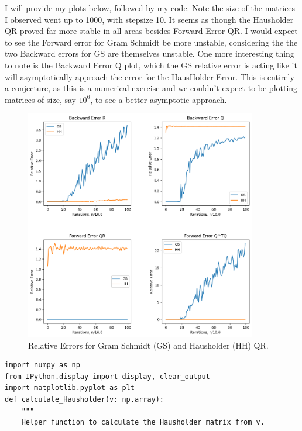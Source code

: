 \partbreak
\begin{solution}

    I will provide my plots below, followed by my code. Note the size of the matrices I observed went up to 1000, with stepsize 10. It seems as though the Hausholder QR proved far more stable in all areas besides Forward Error QR. I would expect to see the Forward error for Gram Schmidt be more unstable, considering the the two Backward errors for GS are themselves unstable. One more interesting thing to note is the Backward Error Q plot, which the GS relative error is acting like it will asymptotically approach the error for the HausHolder Error. This is entirely a conjecture, as this is a numerical exercise and we couldn't expect to be plotting matrices of size, say $10^6$, to see a better asymptotic approach. 

    \begin{figure}[ht]
        \centering
        \includegraphics[width = 0.9\textwidth]{Images/problem6d MC3.png}
        \caption{Relative Errors for Gram Schmidt (GS) and Hausholder (HH) QR.}
        \label{fig:enter-label}
    \end{figure}

\clearpage
\begin{lstlisting}
import numpy as np
from IPython.display import display, clear_output
import matplotlib.pyplot as plt
def calculate_Hausholder(v: np.array):
    """
    Helper function to calculate the Hausholder matrix from v.
    

\end{lstlisting}
\end{solution}

